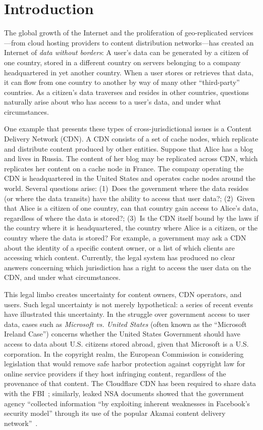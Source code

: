 \section{Introduction}
\label{sec:intro}

The global growth of the Internet and the proliferation of geo-replicated
services---from cloud hosting providers to content distribution networks---has
created an Internet of {\em data without borders}: A user's data can be
generated by a citizen of one country, stored in a different country on
servers belonging to a company headquartered in yet another country. When a
user stores or retrieves that data, it can flow from one country to another by
way of many other ``third-party'' countries. As a citizen's data traverses and resides
in other countries, questions naturally arise about who has access to a user's data,
and under what circumstances.

One example that presents these types of cross-jurisdictional issues is a
Content Delivery Network (CDN).  A CDN consists of a set of cache nodes, which
replicate  and distribute content produced by other entities.  Suppose that
Alice has a blog and lives in Russia.  The content of her blog may be
replicated across CDN, which replicates her content on a cache node in France.
The company operating the CDN is headquartered in the United States and
operates cache nodes around the world. Several questions arise: (1)~Does the government
where the data resides (or where the data transits) have the ability to access that
user data?; (2)~Given that Alice is a citizen of one country, can that country gain
access to Alice's data, regardless of where the data is stored?; (3)~Is the CDN
itself bound by the laws if the country where it is headquartered, the country where
Alice is a citizen, or the country where the data is stored?
For example, a government may ask a CDN about the identity of a specific content
owner, or a list of
which clients are accessing which content.  
Currently, the legal system has produced no clear answers concerning which jurisdiction
has a right to access the user data on the CDN, and under what circumstances.  

This legal limbo creates uncertainty for content owners, CDN operators, and
users. Such legal uncertainty is not merely hypothetical: a series of recent
events have illustrated this uncertainty. In the struggle over government
access to user data, cases such as {\em Microsoft vs. United States} (often
known as the ``Microsoft Ireland Case'') concerns whether the United States
Government should have access to data about U.S. citizens stored abroad, given
that Microsoft is a U.S. corporation. In the copyright realm, the European
Commission is considering legislation that would remove safe harbor protection
against copyright law for online service providers if they host infringing
content, regardless of the provenance of that content. The Cloudflare CDN has
been required to share data with the FBI~\cite{cloudflare_gag}; similarly,
leaked  NSA documents showed that the government agency ``collected
information ``by exploiting inherent weaknesses  in Facebook's security model''
through its use of the popular Akamai content delivery network''~\cite{}.

